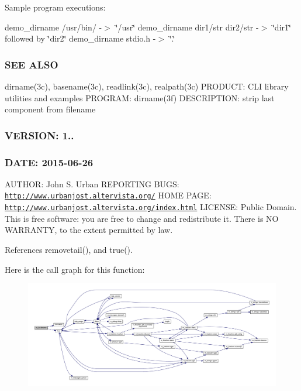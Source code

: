 Sample program executions\+:

demo\+\_\+dirname /usr/bin/ -\/$>$ \char`\"{}/usr\char`\"{} demo\+\_\+dirname dir1/str dir2/str -\/$>$ \char`\"{}dir1\char`\"{} followed by \char`\"{}dir2\char`\"{} demo\+\_\+dirname stdio.\+h -\/$>$ \char`\"{}.\char`\"{}

\subsubsection*{S\+EE A\+L\+SO}

dirname(3c), basename(3c), readlink(3c), realpath(3c) P\+R\+O\+D\+U\+CT\+: C\+LI library utilities and examples P\+R\+O\+G\+R\+AM\+: dirname(3f) D\+E\+S\+C\+R\+I\+P\+T\+I\+ON\+: strip last component from filename \subsubsection*{V\+E\+R\+S\+I\+ON\+: 1..}

\subsubsection*{D\+A\+TE\+: 2015-\/06-\/26}

A\+U\+T\+H\+OR\+: John S. Urban R\+E\+P\+O\+R\+T\+I\+NG B\+U\+GS\+: \href{http://www.urbanjost.altervista.org/}{\tt http\+://www.\+urbanjost.\+altervista.\+org/} H\+O\+ME P\+A\+GE\+: \href{http://www.urbanjost.altervista.org/index.html}{\tt http\+://www.\+urbanjost.\+altervista.\+org/index.\+html} L\+I\+C\+E\+N\+SE\+: Public Domain. This is free software\+: you are free to change and redistribute it. There is NO W\+A\+R\+R\+A\+N\+TY, to the extent permitted by law. 

References removetail(), and true().

Here is the call graph for this function\+:
\nopagebreak
\begin{figure}[H]
\begin{center}
\leavevmode
\includegraphics[width=350pt]{namespacem__io_a85eb6aa886ca8e591fdc837919f81708_cgraph}
\end{center}
\end{figure}
\mbox{\label{namespacem__io_a6793f5adc45177098781af4be39911ff}} 
